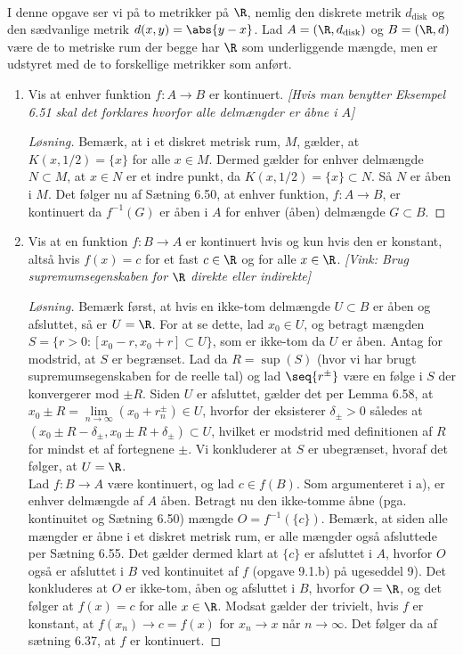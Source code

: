 \begin{opg}\hfill \\
	I denne opgave ser vi på to metrikker på $ \R $, nemlig den diskrete metrik $ d_\text{disk} $ og den sædvanlige metrik $ d(x,y)=\abs{y-x} $.
	Lad $ A=(\R,d_{\text{disk}}) $ og $ B=(\R,d) $ være de to metriske rum der begge har $ \R $ som underliggende mængde, men er udstyret med de to forskellige metrikker som anført.
	\begin{enumerate}
		\item Vis at enhver funktion $ f:A\to B $ er kontinuert. \textsl{[Hvis man benytter Eksempel 6.51 skal det forklares hvorfor alle delmængder er åbne i $ A $]}
		\ifanswers
		\begin{proof}[Løsning]
			Bemærk, at i et diskret metrisk rum, $ M $, gælder, at $ K(x,1/2)=\{x\} $ for alle $ x\in M $. Dermed gælder for enhver delmængde $ N\subset M $, at $ x\in N $ er et indre punkt, da $ K(x,1/2)=\{x\}\subset N $. Så $ N $ er åben i $ M $. Det følger nu af Sætning 6.50, at enhver funktion, $ f:A\to B $, er kontinuert da $ f^{-1}(G) $ er åben i $ A $ for enhver (åben) delmængde $ G\subset B $.
		\end{proof}
		\fi
		\item Vis at en funktion $ f:B\to A $ er kontinuert hvis og kun hvis den er konstant, altså hvis $ f(x)=c $ for et fast $ c\in \R $ og for alle $ x\in\R  $.
		\textsl{[Vink: Brug supremumsegenskaben for $ \R $ direkte eller indirekte]}
		\ifanswers
		\begin{proof}[Løsning]
			Bemærk først, at hvis en ikke-tom delmængde $ U\subset B $ er åben og afsluttet, så er $ U=\R $. For at se dette, lad $ x_0\in U $, og betragt mængden $ S=\{r>0: [x_0-r,x_0+r]\subset U\} $, som er ikke-tom da $ U $ er åben. Antag for modstrid, at $ S $ er begrænset. Lad da $ R=\sup(S) $ (hvor vi har brugt supremumsegenskaben for de reelle tal) og lad $ \seq {r^\pm} $ være en følge i $ S $ der konvergerer mod $ \pm R $. Siden $ U $ er afsluttet, gælder det per Lemma 6.58, at $ x_0\pm R=\lim\limits_{n\to\infty}(x_0+r^\pm_n)\in U $, hvorfor der eksisterer $ \delta_\pm>0 $ således at $ (x_0\pm R-\delta_\pm,x_0\pm R+\delta_\pm)\subset U $, hvilket er modstrid med definitionen af $ R $ for mindst et af fortegnene $ \pm $. Vi konkluderer at $ S $ er ubegrænset, hvoraf det følger, at $ U=\R $.\\
			Lad $ f:B\to A $ være kontinuert, og lad $ c\in f(B) $. Som argumenteret i a), er enhver delmængde af $ A $ åben. Betragt nu den ikke-tomme åbne (pga. kontinuitet og Sætning 6.50) mængde $ O=f^{-1}\left(\{c\}\right) $. Bemærk, at siden alle mængder er åbne i et diskret metrisk rum, er alle mængder også afsluttede per Sætning 6.55. Det gælder dermed klart at $ \{c\} $ er afsluttet i $ A $, hvorfor $ O $ også er afsluttet i $ B $ ved kontinuitet af $ f $ (opgave 9.1.b) på ugeseddel 9). Det konkluderes at $ O $ er ikke-tom, åben og afsluttet i $ B $, hvorfor $ O=\R $, og det følger at $ f(x)=c $ for alle $ x\in\R $. Modsat gælder der trivielt, hvis $ f $ er konstant, at $ f(x_n)\to c=f(x) $ for $ x_n\to x $ når $ n\to\infty $. Det følger da af sætning 6.37, at $ f $ er kontinuert.
			

\end{proof}
\end{enumerate}
\end{opg}
